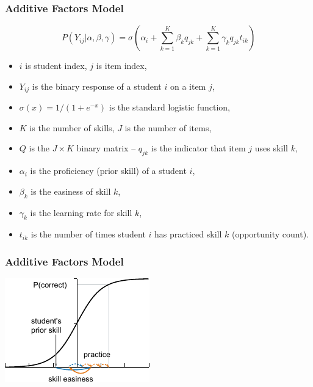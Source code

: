 \documentclass[bigger]{beamer}
\begin{document}
\begin{frame}
  \frametitle{Additive Factors Model}

  \[ P(Y_{ij}|\alpha, \beta, \gamma) = \sigma\left(\alpha_i + \sum_{k=1}^K
    \beta_k q_{jk} + \sum_{k=1}^K \gamma_k q_{jk} t_{ik}\right) \]

\begin{itemize}
\item $i$ is student index, $j$ is item index,
\item $Y_{ij}$ is the binary response of a student $i$ on a item $j$,
\item $\sigma(x) = 1 / (1 + e^{-x})$ is the standard logistic function,
\item $K$ is the number of skills, $J$ is the number of items,
\item $Q$ is the $J\times K$ binary matrix -- $q_{jk}$ is the indicator that
  item $j$ uses skill $k$,
\item $\alpha_i$ is the proficiency (prior skill) of a student $i$,
\item $\beta_k$ is the easiness of skill $k$,
\item $\gamma_k$ is the learning rate for skill $k$,
\item $t_{ik}$ is the number of times student $i$ has practiced skill $k$
  (opportunity count).
\end{itemize}
\end{frame}

\begin{frame}
  \frametitle{Additive Factors Model}

  \begin{center}
    \includegraphics[width=.8\linewidth]{afm-illustration}
  \end{center}
\end{frame}
\end{document}
